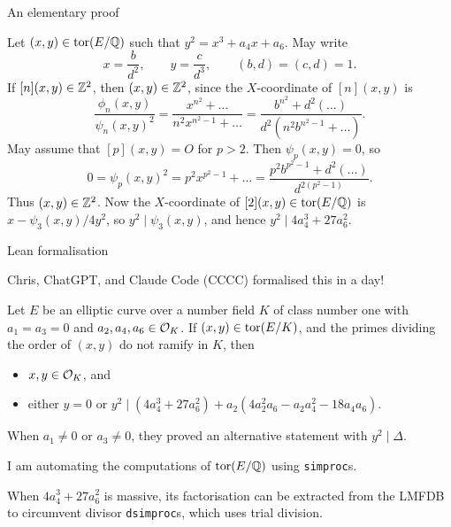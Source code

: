 \begin{frame}{An elementary proof}

Let $ (x, y) \in \operatorname{tor}(E / \mathbb{Q}) $ such that $ y^2 = x^3 + a_4x + a_6 $. May write
$$ x = \dfrac{b}{d^2}, \qquad y = \dfrac{c}{d^3}, \qquad (b, d) = (c, d) = 1. $$
If $ [n](x, y) \in \mathbb{Z}^2 $, then $ (x, y) \in \mathbb{Z}^2 $, since the $ X $-coordinate of $ [n](x, y) $ is
$$ \dfrac{\phi_n(x, y)}{\psi_n(x, y)^2} = \dfrac{x^{n^2} + \dots}{n^2x^{n^2 - 1} + \dots} = \dfrac{b^{n^2} + d^2(\dots)}{d^2(n^2b^{n^2 - 1} + \dots)}. $$
May assume that $ [p](x, y) = O $ for $ p > 2 $. Then $ \psi_p(x, y) = 0 $, so
$$ 0 = \psi_p(x, y)^2 = p^2x^{p^2 - 1} + \dots = \dfrac{p^2b^{p^2 - 1} + d^2(\dots)}{d^{2(p^2 - 1)}}. $$
Thus $ (x, y) \in \mathbb{Z}^2 $. Now the $ X $-coordinate of $ [2](x, y) \in \operatorname{tor}(E / \mathbb{Q}) $ is $ x - \psi_3(x, y) / 4y^2 $, so $ y^2 \mid \psi_3(x, y) $, and hence $ y^2 \mid 4a_4^3 + 27a_6^2 $.

\end{frame}

\begin{frame}{Lean formalisation}

Chris, ChatGPT, and Claude Code (CCCC) formalised this in a day!

\begin{theorem}[CCCC, 2026]
Let $ E $ be an elliptic curve over a number field $ K $ of class number one with $ a_1 = a_3 = 0 $ and $ a_2, a_4, a_6 \in \mathcal{O}_K $. If $ (x, y) \in \operatorname{tor}(E / K) $, and the primes dividing the order of $ (x, y) $ do not ramify in $ K $, then
\begin{itemize}
\item $ x, y \in \mathcal{O}_K $, and
\item either $ y = 0 $ or $ y^2 \mid (4a_4^3 + 27a_6^2) + a_2(4a_2^2a_6 - a_2a_4^2 - 18a_4a_6) $.
\end{itemize}
\end{theorem}

When $ a_1 \ne 0 $ or $ a_3 \ne 0 $, they proved an alternative statement with $ y^2 \mid \Delta $.

\bigskip I am automating the computations of $ \operatorname{tor}(E / \mathbb{Q}) $ using \texttt{simproc}s.

\bigskip When $ 4a_4^3 + 27a_6^2 $ is massive, its factorisation can be extracted from the LMFDB to circumvent divisor \texttt{dsimproc}s, which uses trial division.

\end{frame}

